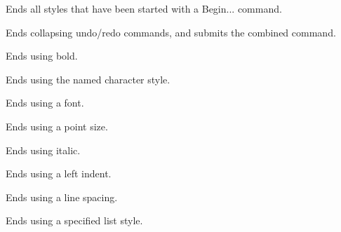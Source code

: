 Ends all styles that have been started with a Begin... command.

\label{wxrichtextbufferendbatchundo}


Ends collapsing undo/redo commands, and submits the combined command.

\label{wxrichtextbufferendbold}


Ends using bold.

\label{wxrichtextbufferendcharacterstyle}


Ends using the named character style.

\label{wxrichtextbufferendfont}


Ends using a font.

\label{wxrichtextbufferendfontsize}


Ends using a point size.

\label{wxrichtextbufferenditalic}


Ends using italic.

\label{wxrichtextbufferendleftindent}


Ends using a left indent.

\label{wxrichtextbufferendlinespacing}


Ends using a line spacing.

\label{wxrichtextbufferendliststyle}


Ends using a specified list style.

\label{wxrichtextbufferendnumberedbullet}

